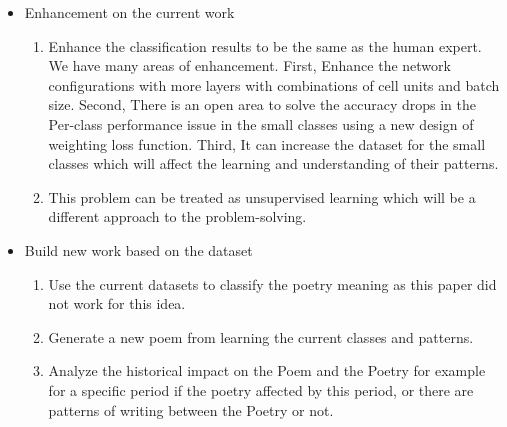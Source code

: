 \begin{itemize}
  \item Enhancement on the current work
  \begin{enumerate}
    \item Enhance the classification results to be the same as the human expert. We have many areas of enhancement. First, Enhance the network configurations with more layers with combinations of cell units and batch size. Second, There is an open area to solve the accuracy drops in the Per-class performance issue in the small classes using a new design of weighting loss function. Third, It can increase the dataset for the small classes which will affect the learning and understanding of their patterns.
    \item This problem can be treated as unsupervised learning which will be a different approach to the problem-solving.
  \end{enumerate}
  \item Build new work based on the dataset
  \begin{enumerate}
    \item Use the current datasets to classify the poetry meaning as this paper did not work for this idea.
    \item Generate a new poem from learning the current classes and patterns.
    \item Analyze the historical impact on the Poem and the Poetry for example for a specific period if the poetry affected by this period, or there are patterns of writing between the Poetry or not.
  \end{enumerate}
  
\end{itemize}



